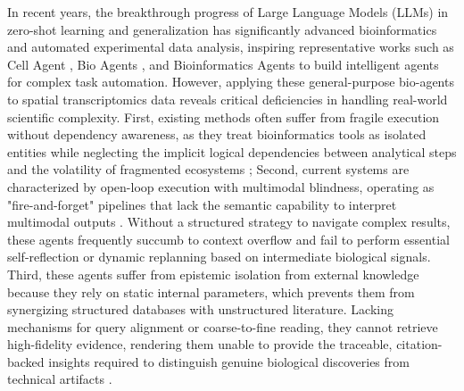 \documentclass[11pt,a4paper]{article}
\begin{document}
\enlargethispage{-65.1pt}
In recent years, the breakthrough progress of Large Language Models (LLMs) in zero-shot learning and generalization has significantly advanced bioinformatics and automated experimental data analysis, inspiring representative works such as Cell Agent \cite{xiao2024cellagent}, Bio Agents \cite{mehandru2025bioagents}, and Bioinformatics Agents \cite{xin2024bioinformatics} to build intelligent agents for complex task automation. However, applying these general-purpose bio-agents to spatial transcriptomics data reveals critical deficiencies in handling real-world scientific complexity. First, existing methods often suffer from fragile execution without dependency awareness, as they treat bioinformatics tools as isolated entities while neglecting the implicit logical dependencies between analytical steps and the volatility of fragmented ecosystems \cite{dries2021giotto,liu2025benchmarking}; Second, current systems are characterized by open-loop execution with multimodal blindness, operating as "fire-and-forget" pipelines that lack the semantic capability to interpret multimodal outputs \cite{wang2025large}. Without a structured strategy to navigate complex results, these agents frequently succumb to context overflow and fail to perform essential self-reflection or dynamic replanning based on intermediate biological signals. Third, these agents suffer from epistemic isolation from external knowledge because they rely on static internal parameters, which prevents them from synergizing structured databases with unstructured literature. Lacking mechanisms for query alignment or coarse-to-fine reading, they cannot retrieve high-fidelity evidence, rendering them unable to provide the traceable, citation-backed insights required to distinguish genuine biological discoveries from technical artifacts \cite{neha2025retrieval}.
\end{document}
